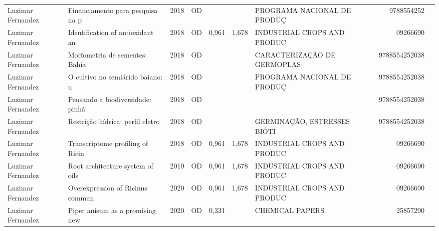 \documentclass[12pt,brazil]{article}\usepackage[]{graphicx}\usepackage[]{xcolor}
\begin{document}
\begin{longtable}{lllrrllrr}
Luzimar Fernandez & Financiamento para pesquisa na p & 2018 & OD &  &  & PROGRAMA NACIONAL DE PRODUÇ & 9788554252 \\
\rowcolor{coautr}\rowcolor{coautr}\rowcolor{coautr}\rowcolor{coautr}\rowcolor{coautr}\rowcolor{coautr}\rowcolor{coautr}\rowcolor{coautr}\rowcolor{coautr}\rowcolor{coautr}\rowcolor{coautr}\rowcolor{coautr}\rowcolor{coautr}\rowcolor{coautr}\rowcolor{coautr}\rowcolor{coautr}Luzimar Fernandez & Identification of antioxidant an & 2018 & OD & 0,961 & 1,678 & INDUSTRIAL CROPS AND PRODUC & 09266690 \\
Luzimar Fernandez & Morfometria de sementes: Bahia & 2018 & OD &  &  & CARACTERIZAÇÃO DE GERMOPLAS & 9788554252038 \\
Luzimar Fernandez & O cultivo no semiárido baiano: u & 2018 & OD &  &  & PROGRAMA NACIONAL DE PRODUÇ & 9788554252038 \\
Luzimar Fernandez & Pensando a biodiversidade: pinhã & 2018 & OD &  &  &  & 9788554252038 \\
Luzimar Fernandez & Restrição hídrica: perfil eletro & 2018 & OD &  &  & GERMINAÇÃO, ESTRESSES BIÓTI & 9788554252038 \\
\rowcolor{coautr}\rowcolor{coautr}\rowcolor{coautr}\rowcolor{coautr}\rowcolor{coautr}\rowcolor{coautr}\rowcolor{coautr}\rowcolor{coautr}\rowcolor{coautr}\rowcolor{coautr}\rowcolor{coautr}\rowcolor{coautr}\rowcolor{coautr}\rowcolor{coautr}\rowcolor{coautr}\rowcolor{coautr}Luzimar Fernandez & Transcriptome profiling of Ricin & 2018 & OD & 0,961 & 1,678 & INDUSTRIAL CROPS AND PRODUC & 09266690 \\
\rowcolor{coautr}\rowcolor{coautr}\rowcolor{coautr}\rowcolor{coautr}\rowcolor{coautr}\rowcolor{coautr}\rowcolor{coautr}\rowcolor{coautr}\rowcolor{coautr}\rowcolor{coautr}\rowcolor{coautr}\rowcolor{coautr}\rowcolor{coautr}\rowcolor{coautr}\rowcolor{coautr}\rowcolor{coautr}Luzimar Fernandez & Root architecture system of oils & 2019 & OD & 0,961 & 1,678 & INDUSTRIAL CROPS AND PRODUC & 09266690 \\
\rowcolor{coautr}\rowcolor{coautr}\rowcolor{coautr}\rowcolor{coautr}\rowcolor{coautr}\rowcolor{coautr}\rowcolor{coautr}\rowcolor{coautr}\rowcolor{coautr}\rowcolor{coautr}\rowcolor{coautr}\rowcolor{coautr}\rowcolor{coautr}\rowcolor{coautr}\rowcolor{coautr}\rowcolor{coautr}Luzimar Fernandez & Overexpression of Ricinus commun & 2020 & OD & 0,961 & 1,678 & INDUSTRIAL CROPS AND PRODUC & 09266690 \\
\rowcolor{coautr}\rowcolor{coautr}\rowcolor{coautr}\rowcolor{coautr}\rowcolor{coautr}\rowcolor{coautr}\rowcolor{coautr}\rowcolor{coautr}\rowcolor{coautr}\rowcolor{coautr}\rowcolor{coautr}\rowcolor{coautr}\rowcolor{coautr}\rowcolor{coautr}\rowcolor{coautr}\rowcolor{coautr}Luzimar Fernandez & Piper anisum as a promising new  & 2020 & OD & 0,331 &  & CHEMICAL PAPERS & 25857290 \\

\end{longtable}
\end{document}
